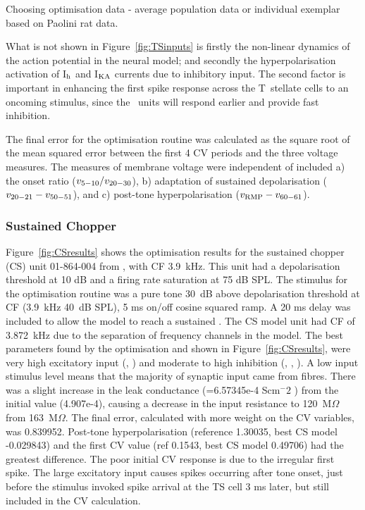 Choosing optimisation data - average population data or individual exemplar based on Paolini rat data.


What is not shown in Figure~\ref{fig:TSinputs} is firstly the non-linear dynamics of the action potential in the neural model; and secondly the hyperpolarisation activation of I$_{\rm h}$ and I$_{\rm KA}$ currents due to inhibitory input.
The second factor is important in enhancing the first spike response across the T~stellate cells \citep{PaoliniClareyEtAl:2004} to an oncoming stimulus, since the \OnC~units will respond earlier and provide fast inhibition.


The final error for the optimisation routine was calculated as the square root of the mean squared error between the first 4 CV periods and the three voltage measures.
The measures of membrane voltage were independent of \RMP included a) the onset ratio ($v_{\rm 5-10}/v_{\rm 20-30}$), b) adaptation of sustained depolarisation ($v_{\rm 20-21} - v_{\rm 50-51}$), and c) post-tone hyperpolarisation ($v_{\rm RMP} - v_{\rm 60-61}$).


\subsubsection{Sustained Chopper}

Figure~\ref{fig:CSresults} shows the optimisation results for the sustained chopper (CS) unit 01-864-004 from \citep{PaoliniClareyEtAl:2005}, with CF 3.9~kHz.
This unit had a depolarisation threshold at 10 dB and a firing rate saturation at 75 dB SPL.
The stimulus for the optimisation routine was a pure tone 30~dB above depolarisation threshold at CF (3.9~kHz 40~dB SPL), 5 ms on/off cosine squared ramp.
A 20 ms delay was included to allow the model to reach a sustained \RMP. The CS model unit had CF of 3.872~kHz due to the separation of frequency channels in the model.
The best parameters found by the optimisation and shown in Figure~\ref{fig:CSresults}, were very high excitatory input (, ) and moderate to high inhibition (, , ).
A low input stimulus level means that the majority of synaptic input came from \HSR fibres.
There was a slight increase in the leak conductance (\gleak=6.57345e-4 Scm$^-2$ ) from the initial value (4.907e-4), causing a decrease in the input resistance to 120~M$\Omega$ from 163~M$\Omega$.
The final error, calculated with more weight on the CV variables, was 0.839952.
Post-tone hyperpolarisation (reference 1.30035, best CS model -0.029843) and the first CV value (ref 0.1543, best CS model 0.49706) had the greatest difference.
The poor initial CV response is due to the irregular first spike.
The large excitatory \HSR input causes spikes occurring after tone onset, just before the stimulus invoked spike arrival at the TS cell 3 ms later, but still included in the CV calculation.


